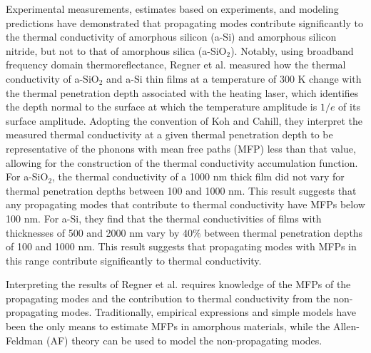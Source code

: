 \documentclass[aps,prb,onecolumn,preprint,superscriptaddress,footinbib,amsmath,amssymb,floatfix]{revtex4}
\begin{document}
Experimental measurements, estimates based on experiments, 
and modeling predictions have demonstrated that propagating modes 
contribute
significantly to the thermal conductivity of amorphous silicon (a-Si)
\cite{feldman_thermal_1993,cahill_thermal_1994,
feldman_numerical_1999,liu_high_2009,yang_anomalously_2010,
he_heat_2011,regner_broadband_2013} 
and amorphous silicon nitride,
\cite{sultan_heat_2013} but not to that of 
amorphous silica (a-SiO$_2$).
\cite{freeman_thermal_1986,graebner_phonon_1986,
cahill_lattice_1988,cahill_thermal_1994,love_estimate_1990,
lee_heat_1997,yamane_measurement_2002,baldi_thermal_2008,
regner_broadband_2013} 
Notably, using broadband frequency domain thermoreflectance, 
Regner et al. measured how the thermal conductivity of a-SiO$_2$ 
and a-Si thin films at a temperature of 300 K change with the 
thermal penetration depth associated with the heating laser, 
which identifies the depth normal to the surface at which the 
temperature amplitude
is $1/e$ of its surface amplitude.\cite{regner_broadband_2013} 
Adopting the convention of Koh and Cahill,\cite{koh_frequency_2007} 
they interpret the measured thermal conductivity at a 
given thermal penetration depth to be representative 
of the phonons with mean free paths (MFP) less than that value, 
allowing for the 
construction of the thermal conductivity accumulation 
function.\cite{dames_thermal_2005,yang_mean_2013} 
For a-SiO$_2$, the thermal conductivity of a 1000 nm thick 
film did not vary for thermal penetration depths between 
100 and 1000 nm. This result suggests 
that any propagating modes that contribute to thermal 
conductivity have MFPs below 100 nm. For a-Si, they find that the 
thermal conductivities of films with thicknesses of 500 and 2000 nm 
vary by 40$\%$ between thermal penetration depths of 
100 and 1000 nm. This result suggests that propagating modes with 
MFPs in this range contribute significantly to thermal conductivity.  

Interpreting the results of Regner et al. requires knowledge of 
the MFPs of the 
propagating modes and the contribution to thermal conductivity 
from the non-propagating modes. 
Traditionally, empirical expressions and
simple models have been the only means
to estimate MFPs in amorphous materials,
\cite{graebner_phonon_1986,
freeman_thermal_1986,cahill_lattice_1988,cahill_heat_1989} 
while the Allen-Feldman (AF) theory can be used to model the 
non-propagating modes.\cite{allen_thermal_1993,feldman_thermal_1993}
\end{document}
